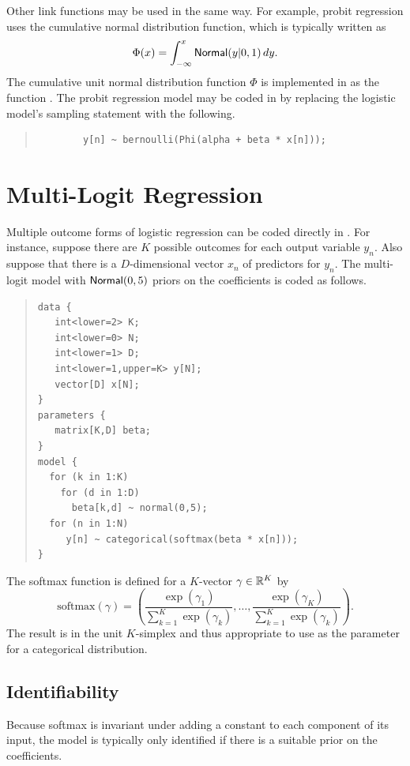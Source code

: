 Other link functions may be used in the same way.  For example, probit
regression uses the cumulative normal distribution function, which is
typically written as 
\[
\Phi(x) = \int_{-\infty}^x \mbox{\sf Normal}(y|0,1) \, dy.
\]
%
The cumulative unit normal distribution function $\Phi$ is implemented
in \Stan as the function .  The probit regression model
may be coded in \Stan by replacing the logistic model's sampling
statement with the following.
%
\begin{quote}
\begin{Verbatim}
        y[n] ~ bernoulli(Phi(alpha + beta * x[n]));
\end{Verbatim}
\end{quote}

\section{Multi-Logit Regression}

Multiple outcome forms of logistic regression can be coded directly in
\Stan.  For instance, suppose there are $K$ possible outcomes for each
output variable $y_n$.  Also suppose that there is a $D$-dimensional
vector $x_n$ of predictors for $y_n$.  The multi-logit model with
$\mbox{\sf Normal}(0,5)$ priors on the coefficients is coded as follows.
%
\begin{quote}
\begin{Verbatim}
data {
   int<lower=2> K;
   int<lower=0> N;
   int<lower=1> D;
   int<lower=1,upper=K> y[N];
   vector[D] x[N];
}
parameters {
   matrix[K,D] beta;
}
model {
  for (k in 1:K)
    for (d in 1:D)
      beta[k,d] ~ normal(0,5);
  for (n in 1:N)
     y[n] ~ categorical(softmax(beta * x[n]));
}
\end{Verbatim}
\end{quote}
%
The softmax function is defined for a $K$-vector $\gamma \in \mathbb{R}^K$ by
\[
\mbox{softmax}(\gamma) = 
\left(
 \frac{\exp(\gamma_1)}
      {\sum_{k=1}^K \exp(\gamma_k)},
  \ldots,
  \frac{\exp(\gamma_K)}
       {\sum_{k=1}^K \exp(\gamma_k)}
\right).
\]
%
The result is in the unit $K$-simplex and thus appropriate to use as
the parameter for a categorical distribution.

\subsection{Identifiability}

Because softmax is invariant under adding a constant to each component
of its input, the model is typically only identified if there is a
suitable prior on the coefficients.

